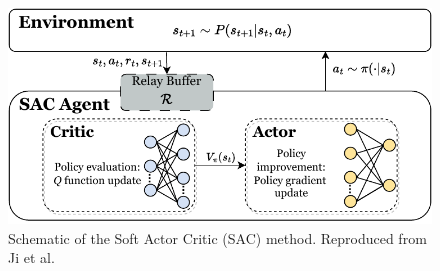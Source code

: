\begin{figure}[htb]
    \centering
    \includegraphics[width=0.75\linewidth]{img/chap4/SAC.pdf}
    \caption{Schematic of the Soft Actor Critic (SAC) method. Reproduced from Ji et al.\cite{ji2022Synthesizing}}
    \label{fig:SAC}
\end{figure}
